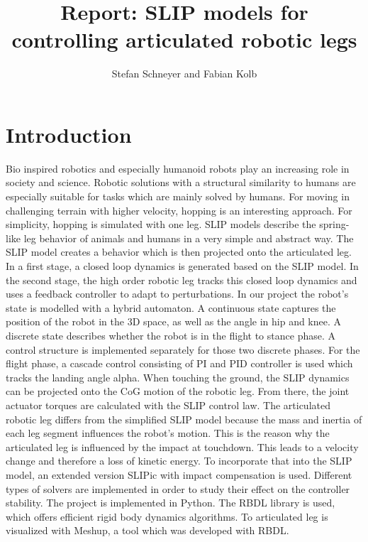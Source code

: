 \documentclass[10pt,conference]{IEEEtran}
\title{\LARGE \bf
Report: SLIP models for controlling articulated robotic legs
}
\author{Stefan Schneyer and Fabian Kolb}
\begin{document}
\maketitle
\thispagestyle{empty}
\pagestyle{empty}



\section{Introduction}
\label{sec:Introduction}


Bio inspired robotics and especially humanoid robots play an increasing role in society and science. Robotic solutions with a structural 
similarity to humans are especially suitable for tasks which are mainly solved by humans. For moving in challenging terrain with higher velocity,
hopping is an interesting approach. For simplicity, hopping is simulated with one leg. SLIP models describe the spring-like leg behavior
of animals and humans in a very simple and abstract way. The SLIP model creates a behavior which is then projected onto the articulated leg. 
In a first stage, a closed loop dynamics is generated based on the SLIP model. In the second stage, the high order robotic leg tracks this closed loop dynamics 
and uses a feedback controller to adapt to perturbations. In our project the robot's state is modelled with a hybrid automaton. 
A continuous state captures the position of the robot in the 3D space, as well as the angle in hip and knee. A discrete state describes whether the robot is 
in the flight to stance phase. A control structure is implemented separately for those two discrete phases. 
For the flight phase, a cascade control consisting of PI and PID controller is used which tracks the landing angle alpha. When touching the ground, the SLIP dynamics 
can be projected onto the CoG motion of the robotic leg. From there, the joint actuator torques are calculated with the SLIP control law. The articulated robotic leg 
differs from the simplified SLIP model because the mass and inertia of each leg segment influences the robot's motion. This is the reason why the articulated 
leg is influenced by the impact at touchdown. This leads to a velocity change and therefore a loss of kinetic energy. To incorporate that into the SLIP model, an extended 
version SLIPic with impact compensation is used. Different types of solvers are implemented in order to study their effect on the controller stability. 
The project is implemented in Python. The RBDL library is used, which offers efficient rigid body dynamics algorithms. To articulated leg is visualized with Meshup, 
a tool which was developed with RBDL.
\end{document}
